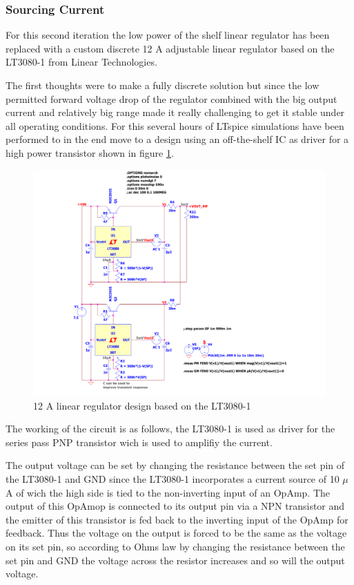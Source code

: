 \subsubsection{Sourcing Current}
For this second iteration the low power of the shelf linear regulator has been replaced with a custom discrete 12 A adjustable linear regulator based on the LT3080-1 from Linear Technologies.

The first thoughts were to make a fully discrete solution but since the low permitted forward voltage drop of the regulator combined with the big output current and relatively big range made it really challenging to get it stable 
under all operating conditions. For this several hours of LTspice simulations have been performed to in the end move to a design using an off-the-shelf IC as driver for a high power transistor shown in figure \ref{fig:LT3080-1_LinRegSchematic}.

\begin{figure}[h!]
    \centering
    \includegraphics[scale=0.3]{LT3080-1_LinRegSchematic.pdf}
    \caption{12 A linear regulator design based on the LT3080-1}
    \label{fig:LT3080-1_LinRegSchematic}
\end{figure}

The working of the circuit is as follows, the LT3080-1 is used as driver for the series pass PNP transistor wich is used to amplifiy the current.

The output voltage can be set by changing the resistance between the set pin of the LT3080-1 and GND since the LT3080-1 incorporates a current source of 10 $\mu$A of wich the high side is tied to the non-inverting input of an OpAmp. The output of this OpAmop is connected to its output pin via a NPN transistor and the emitter of this transistor is fed back to the inverting input of the OpAmp for feedback. Thus the voltage on the output is forced to be the same as the voltage on its set pin, so according to Ohms law by changing the resistance between the set pin and GND the voltage across the resistor increases and so will the output voltage.

